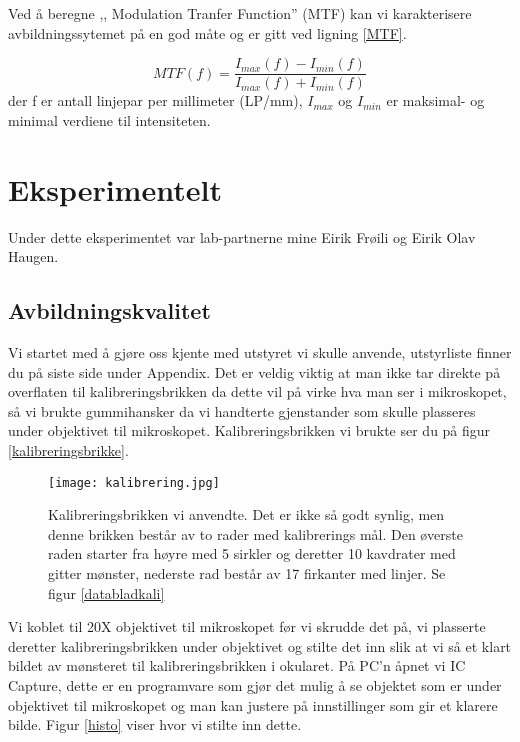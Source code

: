 \documentclass[norsk,a4paper,12pt]{article}
\begin{document}
Ved å beregne ,, Modulation Tranfer Function'' (MTF) kan vi karakterisere avbildningssytemet på en god måte og er gitt ved ligning \vref{MTF}. 

\begin{equation}
MTF(f)=\frac{I_{max}(f)-I_{min}(f)}{I_{max}(f)+I_{min}(f)}
\label{MTF}
\end{equation}
der f er antall linjepar per millimeter (LP/mm), $I_{max}$ og $I_{min}$ er maksimal- og minimal verdiene til intensiteten.


\section{Eksperimentelt}
Under dette eksperimentet var lab-partnerne mine Eirik Frøili og Eirik Olav Haugen.\\

\subsection{Avbildningskvalitet}
Vi startet med å gjøre oss kjente med utstyret vi skulle anvende, utstyrliste finner du på siste side under Appendix. Det er veldig viktig at man ikke tar direkte på overflaten til kalibreringsbrikken da dette vil på virke hva man ser i mikroskopet, så vi brukte gummihansker da vi handterte gjenstander som skulle plasseres under objektivet til mikroskopet. Kalibreringsbrikken vi brukte ser du på figur \vref{kalibreringsbrikke}. 

\begin{figure}
	\begin{center}
  	\texttt{[image: kalibrering.jpg]}\\
	\caption[Kalibreringsbrikke]{Kalibreringsbrikken vi anvendte. Det er ikke så godt synlig, men denne brikken består av to rader med kalibrerings mål. Den øverste raden starter fra høyre med 5 sirkler og deretter 10 kavdrater med gitter mønster, nederste rad består av 17 firkanter med linjer. Se figur \vref{databladkali} }
	\label{kalibreringsbrikke}
	\end{center}
\end{figure}


Vi koblet til 20X objektivet til mikroskopet før vi skrudde det på, vi plasserte deretter kalibreringsbrikken under objektivet og stilte det inn slik at vi så et klart bildet av mønsteret til kalibreringsbrikken i okularet. På PC'n åpnet vi IC Capture, dette er en programvare som gjør det mulig å se objektet som er under objektivet til mikroskopet og man kan justere på innstillinger som gir et klarere bilde. Figur \vref{histo} viser hvor vi stilte inn dette.
\end{document}
